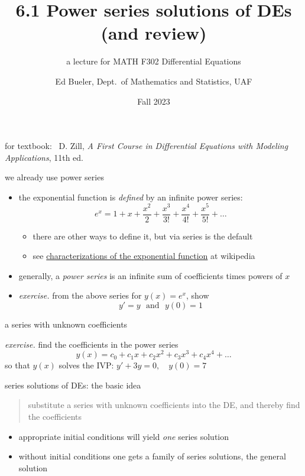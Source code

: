 \documentclass[dvipsnames,colorlinks]{beamer}
\title{6.1 Power series solutions of DEs \\ (and review)}
\subtitle{a lecture for MATH F302 Differential Equations}
\author{Ed Bueler, Dept.~of Mathematics and Statistics, UAF}
\date{Fall 2023}
\begin{document}


\begin{frame}
\titlepage

\centerline{\tiny for textbook: \, D. Zill, \emph{A First Course in Differential Equations with Modeling Applications}, 11th ed.}
\end{frame}


\begin{frame}{we already use power series}

\begin{itemize}
\item the exponential function is \emph{defined} by an infinite power series:
    $$e^x = 1 + x + \frac{x^2}{2} + \frac{x^3}{3!} + \frac{x^4}{4!} + \frac{x^5}{5!} + \dots$$
    \begin{itemize}
    \item there are other ways to define it, but via series is the default
    \item see \href{https://en.wikipedia.org/wiki/Characterizations_of_the_exponential_function}{characterizations of the exponential function} at wikipedia
    \end{itemize}
\item generally, a \emph{power series} is an infinite sum of coefficients times powers of $x$
\item \emph{exercise.} from the above series for $y(x)=e^x$, show
    $$y'=y \,\, \text{ and } \,\, y(0)=1$$
\end{itemize}

\vspace{30mm}
\end{frame}


\begin{frame}{a series with unknown coefficients}

\noindent \emph{exercise.}  find the coefficients in the power series
    $$y(x) = c_0 + c_1 x + c_2 x^2 + c_3 x^3 + c_4 x^4 + \dots$$
so that $y(x)$ solves the IVP: \hfill $y'+3y=0, \quad y(0) = 7$

\vspace{60mm}
\end{frame}


\begin{frame}{series solutions of DEs: the basic idea}

\begin{quotation}
\noindent \alert{substitute a series with unknown coefficients into the DE, and thereby find the coefficients}
\end{quotation}

\bigskip
\begin{itemize}
\item appropriate initial conditions will yield \emph{one} series solution
\item without initial conditions one gets a family of series solutions, the general solution
\end{itemize}
\end{frame}
\end{document}
